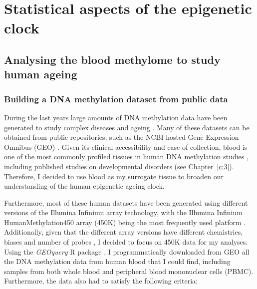 
\chapter{Statistical aspects of the epigenetic clock}  \label{c:2}

\ifpdf
\graphicspath{{Chapter2/Figs/pdf/}}
\else
\graphicspath{{Chapter2/Figs/svg/}}
\fi


\section{Analysing the blood methylome to study human ageing}

\smallskip

\subsection{Building a DNA methylation dataset from public data}

\smallskip

During the last years large amounts of DNA methylation data have been generated to study complex diseases and ageing \cite{Rakyan2011,Flanagan2015}. Many of these datasets can be obtained from public repositories, such as the NCBI-hosted Gene Expression Omnibus (\acrshort{GEO}) \cite{Edgar2002}. Given its clinical accessibility and ease of collection, blood is one of the most commonly profiled tissues in human DNA methylation studies \cite{Flanagan2015}, including published studies on developmental disorders \cite{Aref-Eshghi2018} (see Chapter~\ref{c:3}). Therefore, I decided to use blood as my surrogate tissue to broaden our understanding of the human epigenetic ageing clock.

\bigskip

Furthermore, most of these human datasets have been generated using different versions of the Illumina Infinium array technology, with the Illumina Infinium HumanMethylation450 array (450K) being the most frequently used platform \cite{Flanagan2015}. Additionally, given that the different array versions have different chemistries, biases and number of probes \cite{Bibikova2009,Bibikova2011,Pidsley2016}, I decided to focus on 450K data for my analyses. Using the \textit{GEOquery} R package \cite{Davis2007}, I programmatically downloaded from GEO all the DNA methylation data from human blood that I could find, including samples from both whole blood and peripheral blood mononuclear cells (\acrshort{PBMC}). Furthermore, the data also had to satisfy the following criteria:

